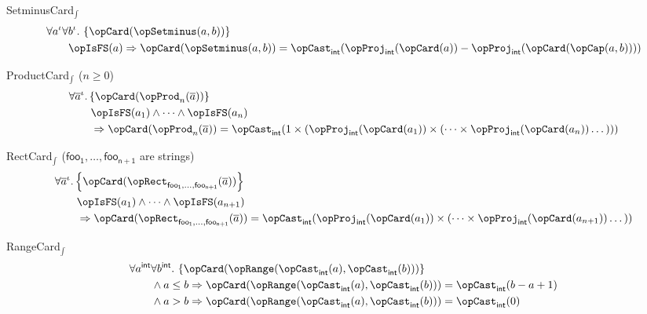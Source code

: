 \documentclass[11pt, a4paper, oneside]{article}
\begin{document}
\begin{axioms}
\item[SetminusCard$_\int$] \[
        \begin{aligned}
            &\forall a^\idv \forall b^\idv.\, \st{ \opCard(\opSetminus(a, b)) } \\
            &\qquad \opIsFS(a) \imp \opCard(\opSetminus(a, b)) = \opCast_\int(\opProj_\int(\opCard(a)) - \opProj_\int(\opCard(\opCap(a, b))))
        \end{aligned}
    \]

\item[ProductCard$_\int$ ($n \ge 0$)] \[
        \begin{aligned}
            &\forall \overline{a}^\idv. \st{ \opCard(\opProd_n(\overline{a})) } \\
            &\qquad \opIsFS(a_1) \wedge \dots \wedge \opIsFS(a_n) \\
            &\qquad \imp \opCard(\opProd_n(\overline{a})) = \opCast_\int(1 \times (\opProj_\int(\opCard(a_1)) \times (\dots \times \opProj_\int(\opCard(a_n)) \dots)))
        \end{aligned}
    \]

\item[RectCard$_\int$ (\rm$\mathsf{foo_1},\dots,\mathsf{foo_{n+1}}$ are strings)] \[
        \begin{aligned}
            &\forall \overline{a}^\idv. \st{ \opCard(\opRect_{\mathsf{foo_1}, \dots, \mathsf{foo_{n+1}}}(\overline{a})) } \\
            &\qquad \opIsFS(a_1) \wedge \dots \wedge \opIsFS(a_{n+1}) \\
            &\qquad \imp \opCard(\opRect_{\mathsf{foo_1}, \dots, \mathsf{foo_{n+1}}}(\overline{a})) = \opCast_\int(\opProj_\int(\opCard(a_1)) \times (\dots \times \opProj_\int(\opCard(a_{n+1})) \dots))
        \end{aligned}
    \]

\item[RangeCard$_\int$] \[
        \begin{aligned}
            &\forall a^\int \forall b^\int.\, \st{ \opCard(\opRange(\opCast_\int(a), \opCast_\int(b))) } \\
            &\qquad \begin{aligned}[t]
                &\wedge a \le b \imp \opCard(\opRange(\opCast_\int(a), \opCast_\int(b))) = \opCast_\int(b - a + 1) \\
                &\wedge a > b \imp \opCard(\opRange(\opCast_\int(a), \opCast_\int(b))) = \opCast_\int(0)
            \end{aligned}
        \end{aligned}
    \]

\end{axioms}
\end{document}

